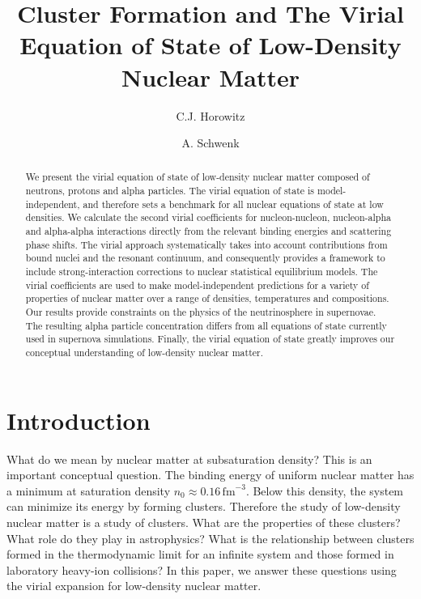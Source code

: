 \documentclass[aps,prc,twocolumn,showpacs,showkeys,amsmath,amssymb]{revtex4}
\begin{document}
\title{Cluster Formation and The Virial Equation of State of 
Low-Density Nuclear Matter}
\author{C.J. Horowitz}
\author{A. Schwenk}


\begin{abstract}

We present the virial equation of state of low-density nuclear matter 
composed of neutrons, protons and alpha particles. The virial equation
of state is model-independent, and therefore sets a benchmark for
all nuclear equations of state at low densities. We calculate the second
virial coefficients for nucleon-nucleon, nucleon-alpha and alpha-alpha
interactions directly from the relevant binding energies and scattering 
phase shifts. The virial approach systematically takes into account 
contributions from bound nuclei and the resonant continuum, 
and consequently provides a framework to include strong-interaction 
corrections to nuclear statistical equilibrium 
models. The virial coefficients are used 
to make model-independent predictions for a variety of properties of nuclear 
matter over a range of densities, temperatures and compositions. Our 
results provide constraints on the physics of the neutrinosphere 
in supernovae. The resulting alpha particle concentration differs from all 
equations of state currently used in supernova simulations. Finally, the 
virial equation of state greatly improves our conceptual understanding of 
low-density nuclear matter.

\end{abstract}

\maketitle 

\section{Introduction}

What do we mean by nuclear matter at subsaturation density?  
This is an important conceptual question.  The binding energy of 
uniform nuclear matter has a minimum at saturation density 
$n_0 \approx 0.16 \, \text{fm}^{-3}$.  Below this density, 
the system can minimize its energy by forming clusters.  Therefore 
the study of low-density nuclear matter is a study of clusters.  
What are the properties of these clusters?  What role do they 
play in astrophysics?  What is the relationship between clusters 
formed in the thermodynamic limit for an infinite system and those 
formed in laboratory heavy-ion collisions?  In this paper, we 
answer these questions using the virial expansion for low-density 
nuclear matter.
\end{document}
